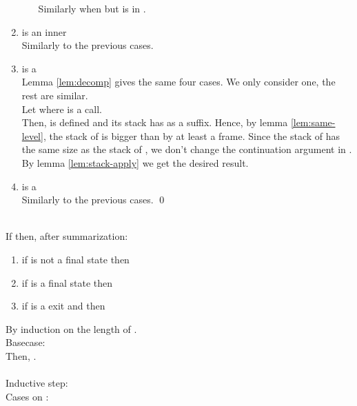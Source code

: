 \documentclass{LMCS}
\theoremstyle{definition} \newtheorem{property}[thm]{Property}
\begin{document}
\begin{enumerate}[(1)]
\begin{enumerate}
    Similarly when  
    but is in \corens{\astatnmo}.
  \end{enumerate}
\item
  \astatnmo{} is an inner \daceval{} \\
  Similarly to the previous cases.
\item
  \astatnmo{} is a \dauapply{} \\
  Lemma \ref{lem:decomp} gives the same four cases.
  We only consider one, the rest are similar. \\
  Let  
  where  is a call. \\
  Then,  is defined and its stack has  as a suffix.
  Hence, by lemma \ref{lem:same-level}, the stack of  is bigger than
   by at least a frame.  
  Since the stack of \astatnmo{} has the same size as the stack of ,
  we don't change the continuation argument in .
  By lemma \ref{lem:stack-apply} we get the desired result.
\item
  \astatnmo{} is a \dacapply{} \\
  Similarly to the previous cases.
  \qed
\end{enumerate}
\newline
\begin{thm}[Soundness] ~\\
If  then, after summarization:
\begin{enumerate}[]
  \item
    if  is not a final state then
    
  \item
    if  is a final state then
    
  \item
    if  is a \daceval{} exit and 
    then 
\end{enumerate}
\end{thm}
\proof
By induction on the length of . \\
Basecase:  \\
Then, . \\ 
\\
Inductive step:  \\
Cases on :
\end{document}
